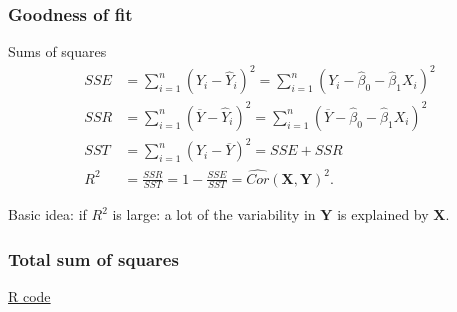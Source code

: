 \documentclass[handout]{beamer}
\begin{document}
   \begin{frame} \frametitle{Goodness of fit}

   \begin{block}
   {Sums of squares}
   $$
   \begin{aligned}
   SSE &= \sum_{i=1}^n(Y_i - \widehat{Y}_i)^2 = \sum_{i=1}^n (Y_i - \widehat{\beta}_0 - \widehat{\beta}_1 X_i)^2 \\
   SSR &= \sum_{i=1}^n(\overline{Y} - \widehat{Y}_i)^2 = \sum_{i=1}^n (\overline{Y} - \widehat{\beta}_0 - \widehat{\beta}_1 X_i)^2 \\
   SST &= \sum_{i=1}^n(Y_i - \overline{Y})^2 = SSE + SSR \\
   R^2 &= \frac{SSR}{SST} = 1 - \frac{SSE}{SST} = \widehat{Cor}(\pmb{X},\pmb{Y})^2.
   \end{aligned}
   $$


   Basic idea: if $R^2$ is large: a lot  of the variability in $\pmb{Y}$ is explained by $\pmb{X}$.

   \end{block}
   \end{frame}



   \begin{frame}
   \frametitle{Total sum of squares}
   \begin{center}
   \end{center}
   \href{http://stats191.stanford.edu/simple_diagnostics.html#goodness-of-fit-sums-of-squares}{R code}
   \end{frame}

\end{document}
